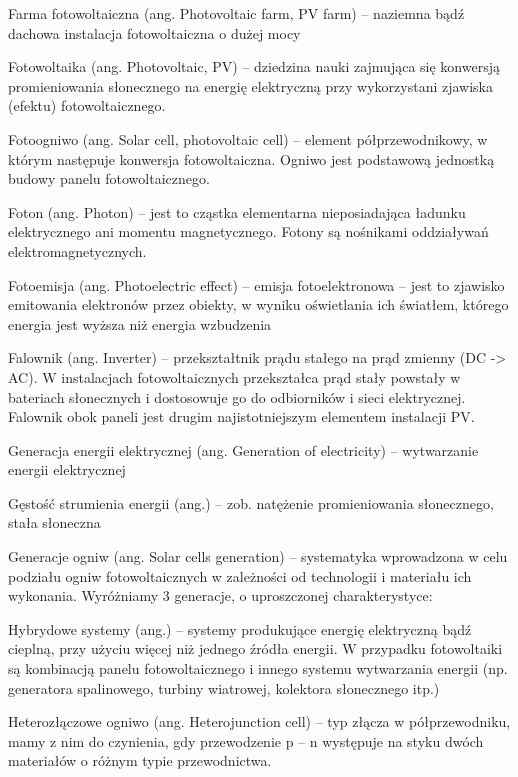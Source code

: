 \documentclass[12pt,a4paper]{article}
\begin{document}
Farma fotowoltaiczna (ang. Photovoltaic farm, PV farm) – naziemna bądź dachowa instalacja fotowoltaiczna o dużej mocy

Fotowoltaika (ang. Photovoltaic, PV) – dziedzina nauki zajmująca się konwersją promieniowania słonecznego na energię elektryczną przy wykorzystani zjawiska (efektu) fotowoltaicznego.

Fotoogniwo (ang. Solar cell, photovoltaic cell) – element półprzewodnikowy, w którym następuje konwersja fotowoltaiczna. Ogniwo jest podstawową jednostką budowy panelu fotowoltaicznego.

Foton (ang. Photon) – jest to cząstka elementarna nieposiadająca ładunku elektrycznego ani momentu magnetycznego. Fotony są nośnikami oddziaływań elektromagnetycznych.

Fotoemisja (ang. Photoelectric effect) – emisja fotoelektronowa – jest to zjawisko emitowania elektronów przez obiekty, w wyniku oświetlania ich światłem, którego energia jest wyższa niż energia wzbudzenia

Falownik (ang. Inverter) – przekształtnik prądu stałego na prąd zmienny (DC -> AC). W instalacjach fotowoltaicznych przekształca prąd stały powstały w bateriach słonecznych i dostosowuje go do odbiorników i sieci elektrycznej. Falownik obok paneli jest drugim najistotniejszym elementem instalacji PV.

Generacja energii elektrycznej (ang. Generation of electricity) – wytwarzanie energii elektrycznej

Gęstość strumienia energii (ang.) – zob. natężenie promieniowania słonecznego, stała słoneczna

Generacje ogniw (ang. Solar cells generation) – systematyka wprowadzona w celu podziału ogniw fotowoltaicznych w zależności od technologii i materiału ich  wykonania. Wyróżniamy 3 generacje, o uproszczonej charakterystyce:


Hybrydowe systemy (ang.) – systemy produkujące energię elektryczną bądź cieplną, przy użyciu więcej niż jednego źródła energii. W przypadku fotowoltaiki są kombinacją panelu fotowoltaicznego i innego systemu wytwarzania energii (np. generatora spalinowego, turbiny wiatrowej, kolektora słonecznego itp.)

Heterozłączowe ogniwo (ang. Heterojunction cell) – typ złącza w półprzewodniku, mamy z nim do czynienia, gdy przewodzenie p – n występuje na styku dwóch materiałów o różnym typie przewodnictwa.
\end{document}
